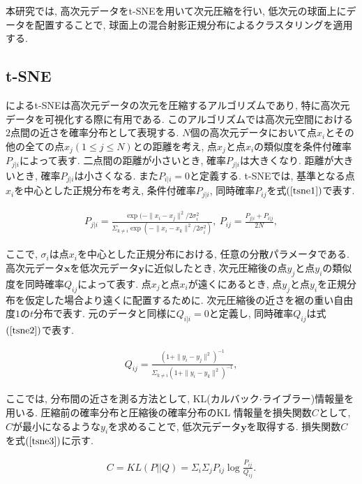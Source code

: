 \documentclass[a4j,12pt]{jarticle}
\begin{document}
本研究では, 高次元データをt-SNEを用いて次元圧縮を行い, 低次元の球面上にデータを配置することで, 球面上の混合射影正規分布によるクラスタリングを適用する. 

\subsection{t-SNE}

\citet{tSNE}によるt-SNEは高次元データの次元を圧縮するアルゴリズムであり, 特に高次元データを可視化する際に有用である. このアルゴリズムでは高次元空間における$2$点間の近さを確率分布として表現する. $N$個の高次元データにおいて点$x_i$とその他の全ての点$x_j (1 \leq j \leq N)$との距離を考え, 点$x_j$と点$x_i$の類似度を条件付確率$P_{j|i}$によって表す. 二点間の距離が小さいとき, 確率$P_{j|i}$は大きくなり. 距離が大きいとき, 確率$P_{j|i}$は小さくなる. また$P_{i|i} = 0$と定義する. t-SNEでは, 基準となる点$x_i$を中心とした正規分布を考え, 条件付確率$P_{j|i}$, 同時確率$P_{ij}$を式$(\ref{tsne1})$で表す.

\begin{eqnarray}
\label{tsne1}
P_{j|i} = \frac{\exp(-\|x_i - x_j\|^2 / 2\sigma_i^2}{\Sigma_{k \neq i}\exp(-\|x_i - x_k\|^2/ 2\sigma_i^2)},\ 
P_{ij} = \frac{P_{j|i} + P_{i|j}}{2N},
\end{eqnarray}

\noindent
ここで, $\sigma_i$は点$x_i$を中心とした正規分布における, 任意の分散パラメータである. 高次元データ$\bm x$を低次元データ$\bm y$に近似したとき, 次元圧縮後の点$y_j$と点$y_i$の類似度を同時確率$Q_{ij}$によって表す. 点$x_j$と点$x_i$が遠くにあるとき, 点$y_j$と点$y_i$を正規分布を仮定した場合より遠くに配置するために. 次元圧縮後の近さを裾の重い自由度$1$の$t$分布で表す. 元のデータと同様に$Q_{i|i} = 0$と定義し, 同時確率$Q_{ij}$は式$(\ref{tsne2})$で表す.

\begin{eqnarray}
\label{tsne2}
Q_{ij} = \frac{(1 + \|y_i - y_j\|^2)^{-1}}{\Sigma_{k \neq i}(1 + \|y_i - y_k\|^2)^{-1}},
\end{eqnarray}

ここでは, 分布間の近さを測る方法として, KL(カルバック$\cdot$ライブラー)情報量を用いる. 圧縮前の確率分布と圧縮後の確率分布のKL
情報量を損失関数$C$として, $C$が最小になるような$y_i$を求めることで, 低次元データ$\bm y$を取得する. 損失関数$C$を式$(\ref{tsne3})$に示す.

\begin{eqnarray}
\label{tsne3}
C = KL(P || Q) = \Sigma_i \Sigma_j P_{ij} \log \frac{P_{ij}}{Q_{ij}}.
\end{eqnarray}
\end{document}
